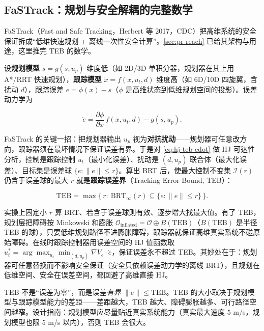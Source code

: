 \subsection{FaSTrack：规划与安全解耦的完整数学}
\label{sec:hj-fastrack}

FaSTrack（Fast and Safe Tracking，Herbert 等 2017，CDC\cite{herbert2017fastrack}）把高维系统的安全保证拆成“低维快速规划 + 离线一次性安全计算”。\cref{sec:pr-reach} 已给其架构与用途，这里推完 TEB 的数学。

设\textbf{规划模型} $\dot s=g(s,u_p)$ 维度低（如 2D/3D 单积分器，规划器在其上用 A*/RRT 快速规划），\textbf{跟踪模型} $\dot x=f(x,u_t,d)$ 维度高（如 6D/10D 四旋翼，含扰动 $d$），跟踪误差 $e=\phi(x)-s$（$\phi$ 是高维状态到低维规划空间的投影）。误差动力学为

\begin{equation}
  \dot e=\frac{\partial\phi}{\partial x}\,f(x,u_t,d)-g(s,u_p).
  \label{eq:hj-teb-edot}
\end{equation}

FaSTrack 的关键一招：把规划器输出 $u_p$ 视为\textbf{对抗扰动}——规划器可任意改方向，跟踪器须在最坏情况下保证误差有界。于是对 \cref{eq:hj-teb-edot} 做 HJ 可达性分析，控制是跟踪控制 $u_t$（最小化误差）、扰动是 $(d,u_p)$ 联合体（最大化误差）、目标集是误差球 $\{e:\|e\|\le r\}$。算出 BRT 后，使最大控制不变集 $\mathcal I(r)$ 仍含于误差球的最大 $r$ 就是\textbf{跟踪误差界}（Tracking Error Bound, TEB）：

\begin{equation}
  \mathrm{TEB}=\max\big\{\,r:\ \mathrm{BRT}_\infty(r)\subseteq\{e:\|e\|\le r\}\,\big\}.
  \label{eq:hj-teb}
\end{equation}

实操上固定小 $r$ 算 BRT、若含于误差球则有效、逐步增大找最大值。有了 TEB，规划层把障碍按 Minkowski 和膨胀 $\mathcal O_{\mathrm{inflated}}=\mathcal O\oplus B(\mathrm{TEB})$（$B(\mathrm{TEB})$ 是半径 TEB 的球），只要低维规划路径不进膨胀障碍，跟踪器就保证高维真实系统不碰原始障碍。在线时跟踪控制器用误差空间的 HJ 值函数取 $u_t^\ast=\arg\max_{u_t}\min_{(d,u_p)}\nabla V_e\cdot\dot e$，保证误差永不超过 TEB。其妙处在于：规划器可任意替换而不影响安全保证（安全只依赖误差动力学的离线 BRT），且规划在低维空间、安全在误差空间，都回避了高维直接 HJ。

\begin{remark}
TEB 不是“误差为零”，而是误差\emph{有界} $\|e\|\le\mathrm{TEB}$。TEB 的大小取决于规划模型与跟踪模型能力的差距——差距越大，TEB 越大、障碍膨胀越多、可行路径空间越窄。设计指南：规划模型应尽量贴近真实系统能力（真实最大速度 $5$ m/s，规划模型也限 $5$ m/s 以内），否则 TEB 会很大。
\end{remark}

